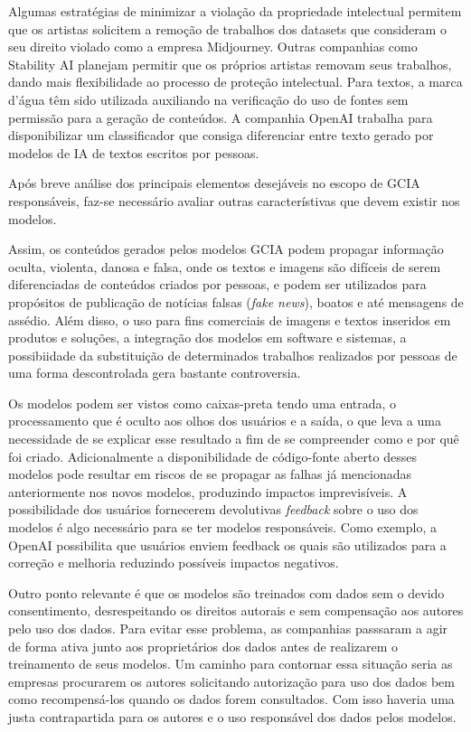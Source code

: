 
Algumas estratégias de minimizar a violação da propriedade intelectual permitem que os artistas solicitem a remoção 
de trabalhos dos datasets que consideram o seu direito violado como a empresa Midjourney. 
Outras companhias como Stability AI planejam permitir que os próprios artistas removam seus trabalhos, 
dando mais flexibilidade ao processo de proteção intelectual. 
Para textos, a marca d'água têm sido utilizada auxiliando na verificação do uso de fontes sem permissão para a geração 
de conteúdos. A companhia OpenAI trabalha para disponibilizar um classificador que consiga diferenciar entre 
texto gerado por modelos de IA de textos escritos por pessoas.


Após breve análise dos principais elementos desejáveis no escopo de GCIA responsáveis, faz-se necessário avaliar  
outras característivas que devem existir nos modelos.

Assim, os conteúdos gerados pelos modelos GCIA podem propagar informação oculta, violenta, danosa e falsa, onde os textos e 
imagens são difíceis de serem diferenciadas de conteúdos criados por pessoas, e podem ser utilizados para propósitos 
de publicação de notícias falsas (\textit{fake news}), boatos e até mensagens de assédio. 
Além disso, o uso para fins comerciais de imagens e textos inseridos 
em produtos e soluções, a integração dos modelos em software e sistemas, a possibiidade da substituição 
de determinados trabalhos realizados por pessoas de uma forma descontrolada gera bastante controversia.

Os modelos podem ser vistos como caixas-preta tendo uma entrada, o processamento que é oculto aos olhos dos usuários 
e a saída, o que leva a uma necessidade de se explicar esse resultado a fim de se compreender como e por quê foi criado.
Adicionalmente a disponibilidade de código-fonte aberto desses modelos pode resultar em riscos de se propagar as falhas 
já mencionadas anteriormente nos novos modelos, produzindo impactos imprevisíveis. 
A possibilidade dos usuários fornecerem devolutivas \textit{feedback} sobre o uso dos modelos é algo necessário
para se ter modelos responsáveis. Como exemplo, a OpenAI possibilita que usuários enviem feedback
os quais são utilizados para a correção e melhoria reduzindo possíveis impactos negativos.

Outro ponto relevante é que os modelos são treinados com dados sem o devido consentimento, desrespeitando os direitos
autorais e sem compensação aos autores pelo uso dos dados. Para evitar esse problema, as companhias passsaram 
a agir de forma ativa junto aos proprietários dos dados antes de realizarem o treinamento de seus modelos. 
Um caminho para contornar essa situação seria as empresas procurarem os autores solicitando autorização 
para uso dos dados bem como recompensá-los quando os dados forem consultados. Com isso haveria uma justa contrapartida 
para os autores e o uso responsável dos dados pelos modelos.

